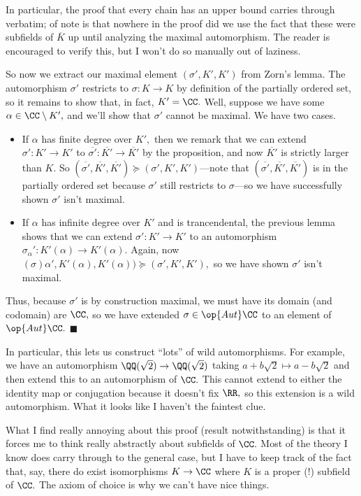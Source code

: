 In particular, the proof that every chain has an upper bound carries through verbatim; of note is that nowhere in the proof did we use the fact that these were subfields of $\overline K$ up until analyzing the maximal automorphism. The reader is encouraged to verify this, but I won't do so manually out of laziness.

So now we extract our maximal element $(\sigma',K',K')$ from Zorn's lemma. The automorphism $\sigma'$ restricts to $\sigma:K\to K$ by definition of the partially ordered set, so it remains to show that, in fact, $K'=\CC.$ Well, suppose we have some $\alpha\in\CC\setminus K',$ and we'll show that $\sigma'$ cannot be maximal. We have two cases.
\begin{itemize}
    \item If $\alpha$ has finite degree over $K',$ then we remark that we can extend $\sigma':K'\to K'$ to $\overline{\sigma'}:\overline{K'}\to\overline{K'}$ by the proposition, and now $\overline{K'}$ is strictly larger than $K.$ So $(\overline{\sigma'},\overline{K'},\overline{K'})\succeq(\sigma',K',K')$---note that $(\overline{\sigma'},\overline{K'},\overline{K'})$ is in the partially ordered set because $\sigma'$ still restricts to $\sigma$---so we have successfully shown $\sigma'$ isn't maximal.
    \item If $\alpha$ has infinite degree over $K'$ and is trancendental, the previous lemma shows that we can extend $\sigma':K'\to K'$ to an automorphism $\sigma_\alpha':K'(\alpha)\to K'(\alpha).$ Again, now $(\sigma)\alpha',K'(\alpha),K'(\alpha))\succeq(\sigma',K',K'),$ so we have shown $\sigma'$ isn't maximal.
\end{itemize}
Thus, because $\sigma'$ is by construction maximal, we must have its domain (and codomain) are $\CC,$ so we have extended $\sigma\in\op{Aut}\CC$ to an element of $\op{Aut}\CC.$ $\blacksquare$

In particular, this lets us construct ``lots'' of wild automorphisms. For example, we have an automorphism $\QQ(\sqrt2)\to\QQ(\sqrt2)$ taking $a+b\sqrt2\mapsto a-b\sqrt2$ and then extend this to an automorphism of $\CC.$ This cannot extend to either the identity map or conjugation because it doesn't fix $\RR,$ so this extension is a wild automorphism. What it looks like I haven't the faintest clue.

What I find really annoying about this proof (result notwithstanding) is that it forces me to think really abstractly about subfields of $\CC.$ Most of the theory I know does carry through to the general case, but I have to keep track of the fact that, say, there do exist isomorphisms $K\to\CC$ where $K$ is a proper (!) subfield of $\CC.$ The axiom of choice is why we can't have nice things.

